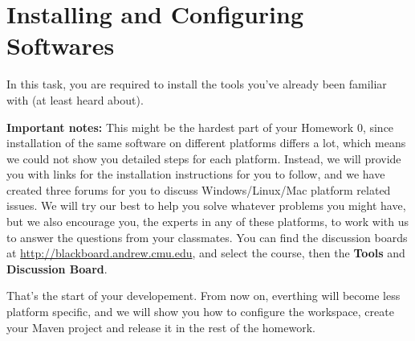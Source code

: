 
\chapter{Installing and Configuring Softwares}

In this task, you are required to install the tools you've already been familiar with (at least heard about).

\textbf{Important notes:} This might be the hardest part of your Homework 0, since installation of the same software on different platforms differs a lot, which means we could not show you detailed steps for each platform. Instead, we will provide you with links for the installation instructions for you to follow, and we have created three forums for you to discuss Windows/Linux/Mac platform related issues. We will try our best to help you solve whatever problems you might have, but we also encourage you, the experts in any of these platforms, to work with us to answer the questions from your classmates. You can find the discussion boards at \url{http://blackboard.andrew.cmu.edu}, and select the course, then the \textbf{Tools} and \textbf{Discussion Board}.









That's the start of your developement. From now on, everthing will become less platform specific, and we will show you how to configure the workspace, create your Maven project and release it in the rest of the homework.



